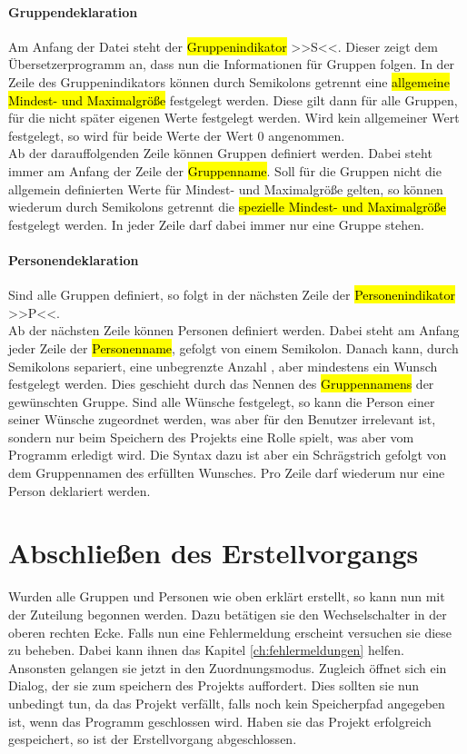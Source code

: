 \paragraph{Gruppendeklaration} Am Anfang der Datei steht der \hl{Gruppenindikator} >>S<<. Dieser zeigt dem Übersetzerprogramm an, dass nun die Informationen für Gruppen folgen. In der Zeile des Gruppenindikators können durch Semikolons  getrennt eine \hl{allgemeine Mindest- und Maximalgröße} festgelegt werden. Diese gilt dann für alle Gruppen, für die nicht später eigenen Werte festgelegt werden. Wird kein allgemeiner Wert festgelegt, so wird für beide Werte der Wert 0 angenommen.\\
Ab der darauffolgenden Zeile können Gruppen definiert werden. Dabei steht immer am Anfang der Zeile der \hl{Gruppenname}. Soll für die Gruppen nicht die allgemein definierten Werte für Mindest- und Maximalgröße gelten, so können wiederum durch Semikolons getrennt die \hl{spezielle Mindest- und Maximalgröße} festgelegt werden. In jeder Zeile darf dabei immer nur eine Gruppe stehen.
\paragraph{Personendeklaration} Sind alle Gruppen definiert, so folgt in der nächsten Zeile der \hl{Personenindikator} >>P<<.\\
Ab der nächsten Zeile können Personen definiert werden. Dabei steht am Anfang jeder Zeile der \hl{Personenname}, gefolgt von einem Semikolon. Danach kann, durch Semikolons separiert, eine unbegrenzte Anzahl , aber mindestens ein Wunsch festgelegt werden. Dies geschieht durch das Nennen des \hl{Gruppennamens} der gewünschten Gruppe. Sind alle Wünsche festgelegt, so kann die Person einer seiner Wünsche zugeordnet werden, was aber für den Benutzer irrelevant ist, sondern nur beim Speichern des Projekts eine Rolle spielt, was aber vom Programm erledigt wird. Die Syntax dazu ist aber ein Schrägstrich gefolgt von dem Gruppennamen des erfüllten Wunsches. Pro Zeile darf wiederum nur eine Person deklariert werden.

\section{Abschließen des Erstellvorgangs}
\label{sec:abschliessen_des_erstellvorgangs}

Wurden alle Gruppen und Personen wie oben erklärt erstellt, so kann nun mit der Zuteilung begonnen werden. Dazu betätigen  sie den Wechselschalter in der oberen rechten Ecke. Falls nun eine Fehlermeldung erscheint versuchen sie diese zu beheben. Dabei kann ihnen das Kapitel \ref{ch:fehlermeldungen} helfen. Ansonsten gelangen sie jetzt in den Zuordnungsmodus. Zugleich öffnet sich ein Dialog, der sie zum speichern des Projekts auffordert. Dies sollten sie nun unbedingt tun, da das Projekt verfällt, falls noch kein Speicherpfad angegeben ist, wenn das Programm geschlossen wird. Haben sie das Projekt erfolgreich gespeichert, so ist der Erstellvorgang abgeschlossen.
